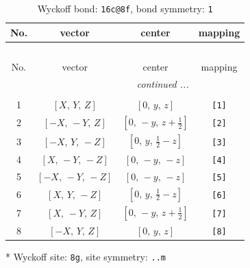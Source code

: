 \documentclass[fleqn,8pt]{jsarticle}
\begin{document}
\renewcommand{\arraystretch}{1.2}
\begin{longtable}{cccc}
\caption{Wyckoff bond: {\tt 16c@8f}, bond symmetry: {\tt 1}}
 \\
 \hline \hline
No. & vector & center & mapping \\ \hline \endfirsthead

\multicolumn{3}{l}{\tablename\ \thetable{}} \\
 \hline \hline
No. & vector & center & mapping \\ \hline \endhead

 \hline \hline
\multicolumn{3}{r}{\footnotesize\it continued ...} \\ \endfoot

 \hline \hline
\multicolumn{3}{r}{} \\ \endlastfoot

1 & $\left[ X,\, Y,\, Z \right]$ & $\left[ 0,\, y,\, z \right]$ & {\tt [1]} \\ \hline
2 & $\left[ - X,\, - Y,\, Z \right]$ & $\left[ 0,\, - y,\, z + \frac{1}{2} \right]$ & {\tt [2]} \\ \hline
3 & $\left[ - X,\, Y,\, - Z \right]$ & $\left[ 0,\, y,\, \frac{1}{2} - z \right]$ & {\tt [3]} \\ \hline
4 & $\left[ X,\, - Y,\, - Z \right]$ & $\left[ 0,\, - y,\, - z \right]$ & {\tt [4]} \\ \hline
5 & $\left[ - X,\, - Y,\, - Z \right]$ & $\left[ 0,\, - y,\, - z \right]$ & {\tt [5]} \\ \hline
6 & $\left[ X,\, Y,\, - Z \right]$ & $\left[ 0,\, y,\, \frac{1}{2} - z \right]$ & {\tt [6]} \\ \hline
7 & $\left[ X,\, - Y,\, Z \right]$ & $\left[ 0,\, - y,\, z + \frac{1}{2} \right]$ & {\tt [7]} \\ \hline
8 & $\left[ - X,\, Y,\, Z \right]$ & $\left[ 0,\, y,\, z \right]$ & {\tt [8]} \\
\end{longtable}
* Wyckoff site: {\tt 8g}, site symmetry: {\tt ..m}
\renewcommand{\arraystretch}{1.2}
\end{document}
